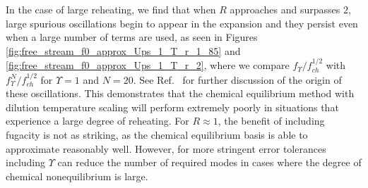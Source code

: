  In the case of large reheating, we find that when $R$ approaches and surpasses $2$, large spurious oscillations begin to appear in the expansion and they persist even when a large number of terms are used, as seen in Figures  \ref{fig:free_stream_f0_approx_Ups_1_T_r_1_85} and \ref{fig:free_stream_f0_approx_Ups_1_T_r_2}, where we compare $f_\Upsilon/f_{ch}^{1/2}$ with $f_{\Upsilon}^N/f_{ch}^{1/2}$ for $\Upsilon=1$ and $N=20$. See Ref.~\cite{Birrell:2014gea} for further discussion of the origin of these oscillations. This demonstrates that the chemical equilibrium method with dilution temperature scaling will  perform extremely poorly in situations that experience a large degree of reheating. For $R\approx 1$, the benefit of including fugacity is not as striking, as the chemical equilibrium basis is able to approximate  reasonably well.  However, for more stringent error tolerances including $\Upsilon$ can reduce the number of required modes in cases where the degree of chemical nonequilibrium is large.
